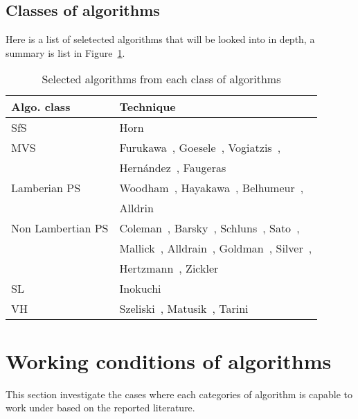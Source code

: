 \subsection{Classes of algorithms}
Here is a list of seletected algorithms that will be looked into in depth, a summary is list in Figure~\ref{tab:class_algo}.
\begin{table}[!htbp]
  \centering
  \begin{tabular}{l|l}
  \toprule
  \textbf{Algo. class} & \textbf{Technique}\\
  \midrule
  SfS & Horn~\cite{horn1970shape}\\
  MVS & Furukawa~\cite{furukawa2010accurate}, Goesele~\cite{goesele2006multi}, Vogiatzis~\cite{vogiatzis2007multiview}, \\
      & Hern{\'a}ndez~\cite{esteban2004silhouette}, Faugeras~\cite{faugeras2002variational}\\
  Lamberian PS & Woodham~\cite{woodham1980photometric}, Hayakawa~\cite{hayakawa1994photometric}, Belhumeur~\cite{belhumeur1999bas}, \\
      & Alldrin~\cite{alldrin2007resolving}\\
  Non Lambertian PS & Coleman~\cite{coleman1982obtaining}, Barsky~\cite{barsky20034}, Schluns~\cite{schluns1993photometric}, Sato~\cite{sato1994temporal}, \\
      & Mallick~\cite{mallick2005beyond}, Alldrain~\cite{alldrin2008photometric}, Goldman~\cite{goldman2010shape}, Silver~\cite{silver1980determining}, \\
      & Hertzmann~\cite{hertzmann2005example}, Zickler~\cite{zickler2002helmholtz}\\
  SL & Inokuchi~\cite{inokuchi1984range}\\
  VH & Szeliski~\cite{szeliski1993rapid}, Matusik~\cite{matusik2002efficient}, Tarini~\cite{tarini2002marching}\\
  \bottomrule
  \end{tabular}
  \caption{Selected algorithms from each class of algorithms}
  \label{tab:class_algo}
\end{table}

\section{Working conditions of algorithms}
This section investigate the cases where each categories of algorithm is capable to work under based on the reported literature.

